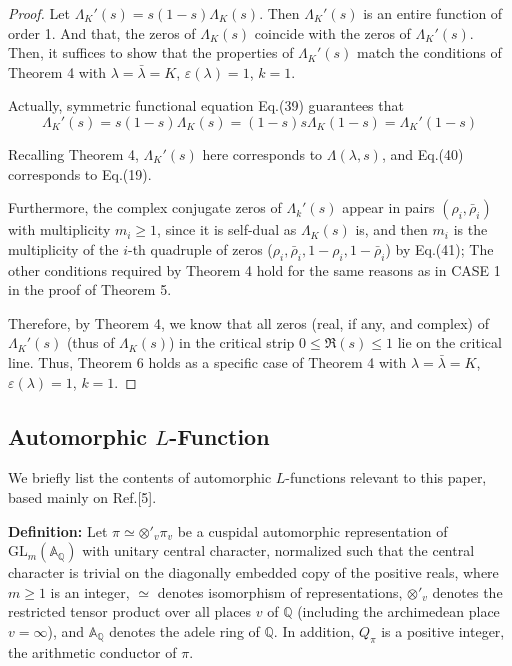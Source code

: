 \documentclass[12pt]{article}
\begin{document}
\begin{proof}
Let $\Lambda_K'(s)=s(1-s)\Lambda_K(s)$. Then $\Lambda_K'(s)$ is an entire function of order 1. And that, the zeros of $\Lambda_K(s)$ coincide with the zeros of $\Lambda_K'(s)$. Then, it suffices to show that the properties of $\Lambda_K'(s)$ match the conditions of Theorem 4 with $\lambda = \bar\lambda = K$, $\varepsilon(\lambda)=1$, $k=1$.

 Actually, symmetric functional equation Eq.(39) guarantees that
\begin{equation}
\Lambda_K'(s)=s(1-s)\Lambda_K(s) = (1-s)s\Lambda_K(1-s)=\Lambda_K'(1-s)
\end{equation}

Recalling Theorem 4, $\Lambda_K'(s)$ here corresponds to $\Lambda(\lambda, s)$, and Eq.(40) corresponds to Eq.(19).

Furthermore, the complex conjugate zeros of $\Lambda_k'(s)$ appear in pairs $(\rho_i, \bar\rho_i)$ with multiplicity $m_i\ge 1$, since it is self-dual as $\Lambda_K(s)$ is, and then $m_i$ is the multiplicity of the $i$-th quadruple of zeros ($\rho_i, \bar\rho_i, 1-\rho_i, 1-\bar\rho_i$) by Eq.(41); The other conditions required by Theorem 4 hold for the same reasons as in CASE 1 in the proof of Theorem 5.

Therefore, by Theorem 4, we know that all zeros (real, if any, and complex) of $\Lambda_K'(s)$  (thus of $\Lambda_K(s)$) in the critical strip $0 \leq \Re(s) \leq 1$ lie on the critical line. Thus, Theorem 6 holds as a specific case of Theorem 4 with $\lambda = \bar\lambda = K$, $\varepsilon(\lambda)=1$, $k=1$.
\end{proof}



\subsection{Automorphic $L$-Function}

We briefly list the contents of automorphic $L$-functions relevant to this paper, based mainly on Ref.[5].

\textbf{Definition:} Let $\pi \simeq \otimes'_v \pi_v$ be a cuspidal automorphic representation of $\mathrm{GL}_m(\mathbb{A}_{\mathbb{Q}})$ with unitary central character, normalized such that the central character is
trivial on the diagonally embedded copy of the positive reals, where $m\ge 1$ is an integer, $\simeq$ denotes isomorphism of representations, $\otimes'_v$ denotes the restricted tensor product over all places $v$ of $\mathbb{Q}$ (including the archimedean place $v=\infty$), and $\mathbb{A}_{\mathbb{Q}}$ denotes the adele ring of $\mathbb{Q}$. In addition, $Q_\pi$ is a positive integer, the arithmetic conductor of $\pi$.
\end{document}
